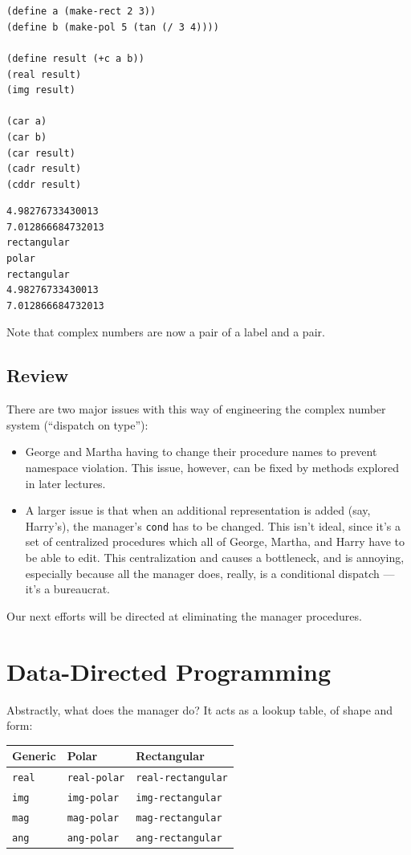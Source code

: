 \documentclass[9pt]{report}
\begin{document}
\begin{verbatim}







(define a (make-rect 2 3))
(define b (make-pol 5 (tan (/ 3 4))))

(define result (+c a b))
(real result)
(img result)

(car a)
(car b)
(car result)
(cadr result)
(cddr result)
\end{verbatim}

\begin{verbatim}
4.98276733430013
7.012866684732013
rectangular
polar
rectangular
4.98276733430013
7.012866684732013
\end{verbatim}


Note that complex numbers are now a pair of a label and a pair.

\subsection{Review}
\label{sec:org2194f05}
There are two major issues with this way of engineering the
complex number system (``dispatch on type''):
\begin{itemize}
\item George and Martha having to change their procedure names to
prevent namespace violation. This issue, however, can be fixed
by methods explored in later lectures.
\item A larger issue is that when an additional representation is
added (say, Harry's), the manager's \texttt{cond} has to be changed.
This isn't ideal, since it's a set of centralized procedures
which all of George, Martha, and Harry have to be able to edit.
This centralization and causes a bottleneck, and is annoying,
especially because all the manager does, really, is a
conditional dispatch --- it's a bureaucrat.
\end{itemize}

Our next efforts will be directed at eliminating the manager
procedures.

\section{Data-Directed Programming}
\label{sec:org17af358}

Abstractly, what does the manager do? It acts as a lookup table, of
shape and form:

\begin{center}
\begin{tabular}{lll}
\toprule
Generic & Polar & Rectangular\\
\midrule
\texttt{real} & \texttt{real-polar} & \texttt{real-rectangular}\\
\texttt{img} & \texttt{img-polar} & \texttt{img-rectangular}\\
\texttt{mag} & \texttt{mag-polar} & \texttt{mag-rectangular}\\
\texttt{ang} & \texttt{ang-polar} & \texttt{ang-rectangular}\\
\bottomrule
\end{tabular}
\end{center}
\end{document}
